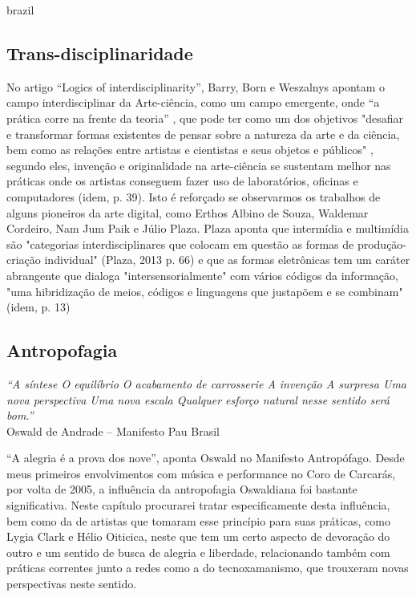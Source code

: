 \begin{otherlanguage*}{brazil}
\subsection{Trans-disciplinaridade}
No artigo ``Logics of interdisciplinarity'', Barry, Born e Weszalnys apontam o campo interdisciplinar da Arte-ciência, como um campo emergente, onde ``a prática corre na frente da teoria'' \cite{Barry2008}, que pode ter como um dos objetivos "desafiar e transformar formas existentes de pensar sobre a natureza da arte e da ciência, bem como as relações entre artistas e cientistas e seus objetos e públicos" , segundo eles, invenção e originalidade na arte-ciência se sustentam melhor nas práticas onde os artistas conseguem fazer uso de laboratórios, oficinas e computadores (idem, p. 39). Isto é reforçado se observarmos os trabalhos de alguns pioneiros da arte digital, como Erthos Albino de Souza, Waldemar Cordeiro, Nam Jum Paik e Júlio Plaza. 
Plaza aponta que intermídia e multimídia são "categorias interdisciplinares  que colocam em questão as formas de produção-criação individual"  (Plaza, 2013 p. 66) e que as formas eletrônicas tem um caráter abrangente que dialoga "intersensorialmente" com vários códigos da informação, "uma hibridização de meios, códigos e linguagens que justapõem e se combinam" (idem, p. 13)

\subsection{Antropofagia}

    \begin{flushright}
        \textit{``A síntese
O equilíbrio
O acabamento de carrosserie
A invenção
A surpresa
Uma nova perspectiva
Uma nova escala
Qualquer esforço natural nesse sentido será bom.''} \\
Oswald de Andrade – Manifesto Pau Brasil    \end{flushright}

``A alegria é a prova dos nove'', aponta Oswald no Manifesto Antropófago. Desde meus primeiros envolvimentos com música e performance no Coro de Carcarás, por volta de 2005, a influência da antropofagia Oswaldiana foi bastante significativa. Neste capítulo procurarei tratar especificamente desta influência, bem como da de artistas que tomaram esse princípio para suas práticas, como Lygia Clark e Hélio Oiticica, neste que tem um certo aspecto de devoração do outro e um sentido de busca de alegria e liberdade, relacionando também com práticas correntes junto a redes como a do tecnoxamanismo, que trouxeram novas perspectivas neste sentido.


\end{otherlanguage*}
